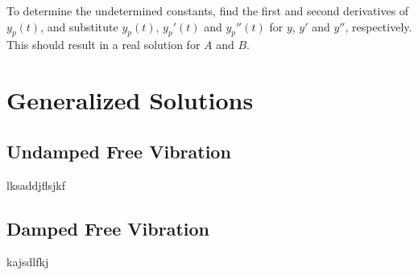 \documentclass[11pt]{article} %
\begin{document}
\begin{multicols}{2}
\begin{flushleft}
To determine the undetermined constants, find  the first and second derivatives of $y_p(t)$, and substitute $y_p(t)$, $y_p'(t)$ and $y_p''(t)$ for $y$, $y'$ and $y''$, respectively. This should result in a real solution for $A$ and $B$.

\section {Generalized Solutions}
\subsection {Undamped Free Vibration}
lksaddjflsjkf
\subsection {Damped Free Vibration}
kajsdlfkj

\end{flushleft}
\end{multicols}
\end{document}
